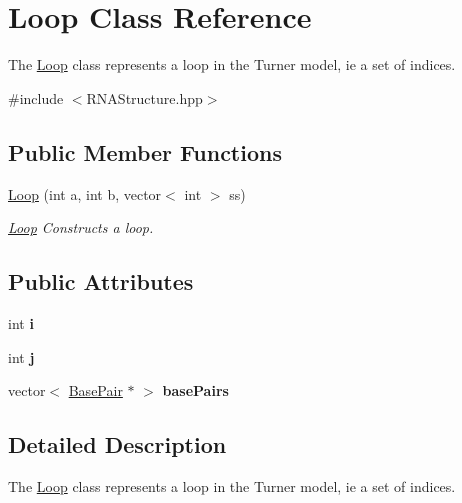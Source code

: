 \hypertarget{class_loop}{}\section{Loop Class Reference}
\label{class_loop}


The \hyperlink{class_loop}{Loop} class represents a loop in the Turner model, ie a set of indices.  




{\ttfamily \#include $<$R\+N\+A\+Structure.\+hpp$>$}

\subsection*{Public Member Functions}
\begin{DoxyCompactItemize}
\item 
\hyperlink{class_loop_a9ef643107e015c5825bff474b925de6d}{Loop} (int a, int b, vector$<$ int $>$ ss)
\begin{DoxyCompactList}\small\item\em \hyperlink{class_loop}{Loop} Constructs a loop. \end{DoxyCompactList}\end{DoxyCompactItemize}
\subsection*{Public Attributes}
\begin{DoxyCompactItemize}
\item 
\mbox{\label{class_loop_a8fd8621820eb5febb62c92e60e574be7}} 
int {\bfseries i}
\item 
\mbox{\label{class_loop_a78e5e1114e751977fdc337848f865049}} 
int {\bfseries j}
\item 
\mbox{\label{class_loop_a9c0299c6c6e1878d7f8d287d4d6701d6}} 
vector$<$ \hyperlink{class_base_pair}{Base\+Pair} $\ast$ $>$ {\bfseries base\+Pairs}
\end{DoxyCompactItemize}


\subsection{Detailed Description}
The \hyperlink{class_loop}{Loop} class represents a loop in the Turner model, ie a set of indices. 

